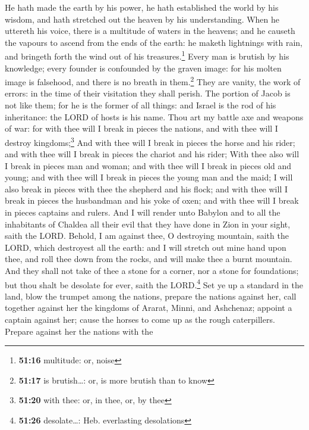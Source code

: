 He hath made the earth by his power, he hath established the world by
his wisdom, and hath stretched out the heaven by his understanding.
 When he uttereth his voice, there is a multitude of
waters in the heavens; and he causeth the vapours to ascend from the
ends of the earth: he maketh lightnings with rain, and bringeth forth
the wind out of his treasures.\footnote{\textbf{51:16} multitude: or,
  noise}  Every man is brutish by his knowledge; every
founder is confounded by the graven image: for his molten image is
falsehood, and there is no breath in them.\footnote{\textbf{51:17} is
  brutish\ldots: or, is more brutish than to know}  They
are vanity, the work of errors: in the time of their visitation they
shall perish.  The portion of Jacob is not like them; for
he is the former of all things: and Israel is the rod of his
inheritance: the LORD of hosts is his name.  Thou art my
battle axe and weapons of war: for with thee will I break in pieces the
nations, and with thee will I destroy kingdoms;\footnote{\textbf{51:20}
  with thee: or, in thee, or, by thee}  And with thee
will I break in pieces the horse and his rider; and with thee will I
break in pieces the chariot and his rider;  With thee
also will I break in pieces man and woman; and with thee will I break in
pieces old and young; and with thee will I break in pieces the young man
and the maid;  I will also break in pieces with thee the
shepherd and his flock; and with thee will I break in pieces the
husbandman and his yoke of oxen; and with thee will I break in pieces
captains and rulers.  And I will render unto Babylon and
to all the inhabitants of Chaldea all their evil that they have done in
Zion in your sight, saith the LORD.  Behold, I am against
thee, O destroying mountain, saith the LORD, which destroyest all the
earth: and I will stretch out mine hand upon thee, and roll thee down
from the rocks, and will make thee a burnt mountain.  And
they shall not take of thee a stone for a corner, nor a stone for
foundations; but thou shalt be desolate for ever, saith the
LORD.\footnote{\textbf{51:26} desolate\ldots: Heb. everlasting
  desolations}  Set ye up a standard in the land, blow
the trumpet among the nations, prepare the nations against her, call
together against her the kingdoms of Ararat, Minni, and Ashchenaz;
appoint a captain against her; cause the horses to come up as the rough
caterpillers.  Prepare against her the nations with the
